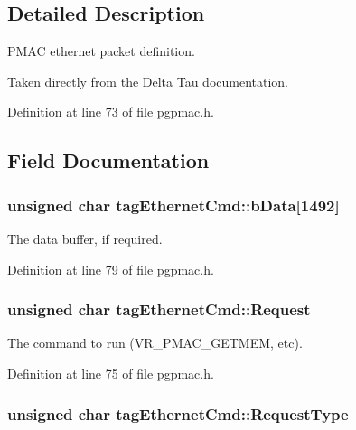 \subsection{Detailed Description}
P\-M\-A\-C ethernet packet definition. 

Taken directly from the Delta Tau documentation. 

Definition at line 73 of file pgpmac.\-h.



\subsection{Field Documentation}
\hypertarget{structtagEthernetCmd_a872dab798127d6f589974a79c5d0aef1}{
\subsubsection[{b\-Data}]{\setlength{\rightskip}{0pt plus 5cm}unsigned char tag\-Ethernet\-Cmd\-::b\-Data\mbox{[}1492\mbox{]}}}\label{structtagEthernetCmd_a872dab798127d6f589974a79c5d0aef1}


The data buffer, if required. 



Definition at line 79 of file pgpmac.\-h.

\hypertarget{structtagEthernetCmd_a0dc566e7edbb226f1a4ea443d93d56e2}{
\subsubsection[{Request}]{\setlength{\rightskip}{0pt plus 5cm}unsigned char tag\-Ethernet\-Cmd\-::\-Request}}\label{structtagEthernetCmd_a0dc566e7edbb226f1a4ea443d93d56e2}


The command to run (V\-R\-\_\-\-P\-M\-A\-C\-\_\-\-G\-E\-T\-M\-E\-M, etc). 



Definition at line 75 of file pgpmac.\-h.

\hypertarget{structtagEthernetCmd_a6a155eb3ae546dd29369c4a33ddb3310}{
\subsubsection[{Request\-Type}]{\setlength{\rightskip}{0pt plus 5cm}unsigned char tag\-Ethernet\-Cmd\-::\-Request\-Type}}\label{structtagEthernetCmd_a6a155eb3ae546dd29369c4a33ddb3310}


